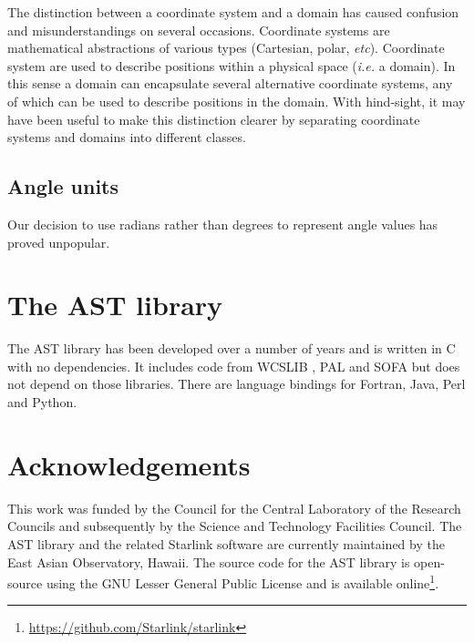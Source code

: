 \documentclass[final,authoryear,5p,times,twocolumn]{elsarticle}
\begin{document}
The distinction between a coordinate system and a domain has caused
confusion and misunderstandings on several occasions. Coordinate systems are
mathematical abstractions of various types (Cartesian, polar, \emph{etc}).
Coordinate system are used to describe positions within a physical space
(\emph{i.e.} a domain). In this sense a domain can encapsulate several
alternative coordinate systems, any of which can be used to describe positions
in the domain. With hind-sight, it may have been useful to make this
distinction clearer by separating coordinate systems and domains into
different classes.

\subsection{Angle units}

Our decision to use radians rather than degrees to represent angle values
has proved unpopular.

\section{The AST library}

The AST library has been developed over a number of years
\citep{1998ASPC..145...41W,2000ASPC..216..506W,2001ASPC..238..129B,2004ASPC..314..412B,2008ASPC..394..635B,2010ASPC..434..213B,2012ASPC..461..825B}
  and is written in C with no dependencies. It includes code from
  WCSLIB \citep[][]{2006ASPC..351..591C}, PAL \citep{2013ASPC..475..307J}
  and SOFA \citep[][]{2011SchpJ...611404H} but does not depend on those
  libraries. There are language bindings for Fortran, Java, Perl and
  Python.

\section{Acknowledgements}

This work was funded by the Council for the Central Laboratory of the
Research Councils and subsequently by the Science and Technology
Facilities Council.  The AST library and the related Starlink software
are currently maintained by the East Asian Observatory, Hawaii. The
source code for the AST library is open-source using the GNU Lesser General
Public License and is available
online\footnote{\url{https://github.com/Starlink/starlink}}.
\end{document}

